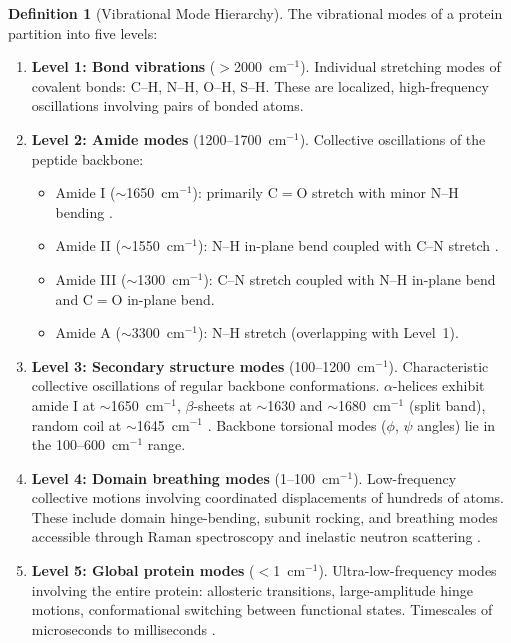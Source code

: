 \documentclass[11pt,twocolumn,a4paper]{article}
\theoremstyle{definition}
\newtheorem{definition}[theorem]{Definition}
\theoremstyle{remark}
\begin{document}
\begin{definition}[Vibrational Mode Hierarchy]
\label{def:hierarchy}
The vibrational modes of a protein partition into five levels:
\begin{enumerate}[nosep]
\item \textbf{Level 1: Bond vibrations} ($>$2000~cm$^{-1}$). Individual stretching modes of covalent bonds: C--H, N--H, O--H, S--H. These are localized, high-frequency oscillations involving pairs of bonded atoms.
\item \textbf{Level 2: Amide modes} (1200--1700~cm$^{-1}$). Collective oscillations of the peptide backbone:
\begin{itemize}[nosep]
\item Amide I ($\sim$1650~cm$^{-1}$): primarily C$=$O stretch with minor N--H bending \citep{barth2007, krimm1986}.
\item Amide II ($\sim$1550~cm$^{-1}$): N--H in-plane bend coupled with C--N stretch \citep{barth2002}.
\item Amide III ($\sim$1300~cm$^{-1}$): C--N stretch coupled with N--H in-plane bend and C$=$O in-plane bend.
\item Amide A ($\sim$3300~cm$^{-1}$): N--H stretch (overlapping with Level~1).
\end{itemize}
\item \textbf{Level 3: Secondary structure modes} (100--1200~cm$^{-1}$). Characteristic collective oscillations of regular backbone conformations. $\alpha$-helices exhibit amide I at $\sim$1650~cm$^{-1}$, $\beta$-sheets at $\sim$1630 and $\sim$1680~cm$^{-1}$ (split band), random coil at $\sim$1645~cm$^{-1}$ \citep{barth2002, barth2007}. Backbone torsional modes ($\phi$, $\psi$ angles) lie in the 100--600~cm$^{-1}$ range.
\item \textbf{Level 4: Domain breathing modes} (1--100~cm$^{-1}$). Low-frequency collective motions involving coordinated displacements of hundreds of atoms. These include domain hinge-bending, subunit rocking, and breathing modes accessible through Raman spectroscopy and inelastic neutron scattering \citep{go1983, bahar1997}.
\item \textbf{Level 5: Global protein modes} ($<$1~cm$^{-1}$). Ultra-low-frequency modes involving the entire protein: allosteric transitions, large-amplitude hinge motions, conformational switching between functional states. Timescales of microseconds to milliseconds \citep{tirion1996}.
\end{enumerate}
\end{definition}
\end{document}
